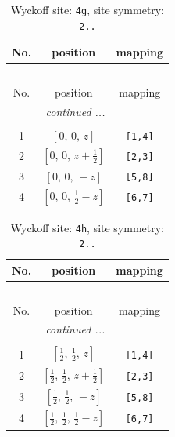 \documentclass[fleqn,8pt]{jsarticle}
\begin{document}
\begin{longtable}{ccc}
\caption{Wyckoff site: {\tt 4g}, site symmetry: {\tt 2..}}
 \\
 \hline \hline
No. & position & mapping \\ \hline \endfirsthead

\multicolumn{2}{l}{\tablename\ \thetable{}} \\
 \hline \hline
No. & position & mapping \\ \hline \endhead

 \hline \hline
\multicolumn{2}{r}{\footnotesize\it continued ...} \\ \endfoot

 \hline \hline
\multicolumn{2}{r}{} \\ \endlastfoot

1 & $\left[ 0,\, 0,\, z \right]$ & {\tt [1,4]} \\ \hline
2 & $\left[ 0,\, 0,\, z + \frac{1}{2} \right]$ & {\tt [2,3]} \\ \hline
3 & $\left[ 0,\, 0,\, - z \right]$ & {\tt [5,8]} \\ \hline
4 & $\left[ 0,\, 0,\, \frac{1}{2} - z \right]$ & {\tt [6,7]} \\
\end{longtable}
\renewcommand{\arraystretch}{1.2}
\begin{longtable}{ccc}
\caption{Wyckoff site: {\tt 4h}, site symmetry: {\tt 2..}}
 \\
 \hline \hline
No. & position & mapping \\ \hline \endfirsthead

\multicolumn{2}{l}{\tablename\ \thetable{}} \\
 \hline \hline
No. & position & mapping \\ \hline \endhead

 \hline \hline
\multicolumn{2}{r}{\footnotesize\it continued ...} \\ \endfoot

 \hline \hline
\multicolumn{2}{r}{} \\ \endlastfoot

1 & $\left[ \frac{1}{2},\, \frac{1}{2},\, z \right]$ & {\tt [1,4]} \\ \hline
2 & $\left[ \frac{1}{2},\, \frac{1}{2},\, z + \frac{1}{2} \right]$ & {\tt [2,3]} \\ \hline
3 & $\left[ \frac{1}{2},\, \frac{1}{2},\, - z \right]$ & {\tt [5,8]} \\ \hline
4 & $\left[ \frac{1}{2},\, \frac{1}{2},\, \frac{1}{2} - z \right]$ & {\tt [6,7]} \\
\end{longtable}
\end{document}
